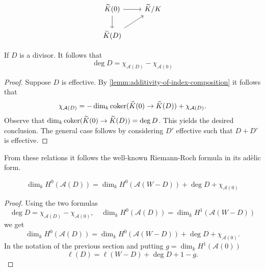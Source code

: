 \[
	\begin{tikzcd}
		\widetilde{K}(0) \ar[r] \ar[d] & \widetilde{K}/K \\
		\widetilde{K}(D) \ar[ur] &
	\end{tikzcd}
\]
\begin{lemma}\label{lemm:equation-effective-divisors}
	If $D$ is a divisor. It follows that 
	\[
		\deg D =  \chi_{\mathcal{A}(D)} - \chi_{\mathcal{A}(0)}
	\]
\end{lemma}
\begin{proof}
	Suppose $D$ is effective. By \cref{lemm:additivity-of-index-composition} it follows that
	\[
		\chi_{\mathcal{A}(D)} = -\dim_{k}\operatorname{coker}(\widetilde{K}(0) \to \widetilde{K}(D)) + \chi_{\mathcal{A}(D)}.
	\]
	Observe that $\dim_{k}\operatorname{coker}(\widetilde{K}(0) \to \widetilde{K}(D)) = \deg D$. This yields the desired conclusion. The general case follows by considering $D'$ effective such that $D + D'$ is effective.
\end{proof}
From these relations it follows the well-known Riemann-Roch formula in its adèlic form.

\begin{theorem}\label{thm:riemann-roch-adèle}
	\[
		\dim_{k} H^{0}(\mathcal{A}(D)) = \dim_{k}H^{0}(\mathcal{A}(W - D)) + \deg D + \chi_{\mathcal{A}(0)}
	\]
\end{theorem}
\begin{proof}
	Using the two formulas
	\[
		\deg D = \chi_{\mathcal{A}(D)} - \chi_{\mathcal{A}(0)}, \quad \dim_{k}H^{0}(\mathcal{A}(D)) = \dim_{k}H^{1}(\mathcal{A}(W - D))
	\]
	we get
	\[
		\dim_{k}H^{0}(\mathcal{A}(D)) = \dim_{k}H^{0}(\mathcal{A}(W - D)) + \deg D + \chi_{\mathcal{A}(0)}. 
	\]
	In the notation of the previous section and putting $g = \dim_{k}H^{1}(\mathcal{A}(0))$
	\[
		\ell(D) = \ell(W - D) + \deg D + 1 - g.
	\]
\end{proof}

